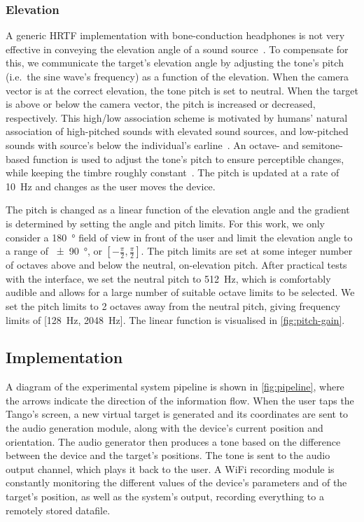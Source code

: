\documentclass{llncs}
\begin{document}
\subsubsection{Elevation}

A generic HRTF implementation with bone-conduction headphones is not very effective in conveying the elevation angle of a sound source~\cite{macdonald2006spatial,schonstein2008comparison}.
To compensate for this, we communicate the target's elevation angle by adjusting the tone's pitch (i.e.\ the sine wave's frequency) as a function of the elevation. 
When the camera vector is at the correct elevation, the tone pitch is set to neutral.
When the target is above or below the camera vector, the pitch is increased or decreased, respectively.
This high/low association scheme is motivated by humans' natural association of high-pitched sounds with elevated sound sources, and low-pitched sounds with source's below the individual's earline~\cite{pratt1930spatial,blauert1997spatial}.
An octave- and semitone-based function is used to adjust the tone's pitch to ensure perceptible changes, while keeping the timbre roughly constant~\cite{shepard1964circularity}.
The pitch is updated at a rate of \SI{10}{\hertz} and changes as the user moves the device.

The pitch is changed as a linear function of the elevation angle and the gradient is determined by setting the angle and pitch limits.
For this work, we only consider a \SI{180}{\degree} field of view in front of the user and limit the elevation angle to a range of \SI{\pm90}{\degree}, or $[-\frac{\pi}{2}, \frac{\pi}{2}]$.
The pitch limits are set at some integer number of octaves above and below the neutral, on-elevation pitch.
After practical tests with the interface, we set the neutral pitch to \SI{512}{\hertz}, which is comfortably audible and allows for a large number of suitable octave limits to be selected.
We set the pitch limits to 2 octaves away from the neutral pitch, giving frequency limits of [\SI{128}{\hertz}, \SI{2048}{\hertz}].
The linear function is visualised in \cref{fig:pitch-gain}.

\subsection{Implementation}

A diagram of the experimental system pipeline is shown in \cref{fig:pipeline}, where the arrows indicate the direction of the information flow.
When the user taps the Tango's screen, a new virtual target is generated and its coordinates are sent to the audio generation module, along with the device's current position and orientation.
The audio generator then produces a tone based on the difference between the device and the target's positions. The tone is sent to the audio output channel, which plays it back to the user.
A WiFi recording module is constantly monitoring the different values of the device's parameters and of the target's position, as well as the system's output, recording everything to a remotely stored datafile. 
\end{document}
